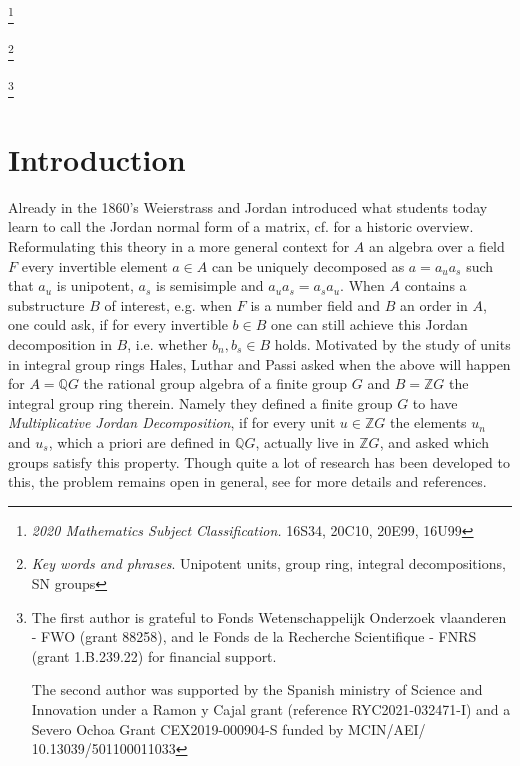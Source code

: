\documentclass[a4paper,10pt]{amsart}
\theoremstyle{definition}
\theoremstyle{remark}
\begin{document}
\maketitle

\newcommand\blfootnote[1]{%
  \begingroup
  \renewcommand\thefootnote{}\footnote{#1}%
  \addtocounter{footnote}{-1}%
  \endgroup
}

\blfootnote{\textit{2020 Mathematics Subject Classification.} 16S34, 20C10, 20E99, 16U99}
\blfootnote{\textit{Key words and phrases}. Unipotent units, group ring, integral decompositions, SN groups}
\blfootnote{The first author is grateful to Fonds Wetenschappelijk Onderzoek vlaanderen - FWO (grant 88258), and le Fonds de la Recherche Scientifique - FNRS (grant 1.B.239.22) for financial support.

The second author was supported by the Spanish ministry of Science and Innovation under a Ramon y Cajal grant (reference RYC2021-032471-I) and a Severo Ochoa Grant CEX2019-000904-S funded by MCIN/AEI/ 10.13039/501100011033}

\vspace{-0,4cm}
\tableofcontents

\section{Introduction}
Already in the 1860's Weierstrass and Jordan introduced what students today learn to call the Jordan normal form of a matrix, cf. \cite{Hawkins} for a historic overview. Reformulating this theory in a more general context for $A$ an algebra over a field $F$ every invertible element $a \in A$ can be uniquely decomposed as $a = a_u a_s$ such that $a_u$ is unipotent, $a_s$ is semisimple and $a_u a_s = a_sa_u$. When $A$ contains a substructure $B$ of interest, e.g. when $F$ is a number field and $B$ an order in $A$, one could ask, if for every invertible $b \in B$ one can still achieve this Jordan decomposition in $B$, i.e. whether $b_n,b_s \in B$ holds. Motivated by the study of units in integral group rings Hales, Luthar and Passi asked when the above will happen for $A= \mathbb{Q}G$ the rational group algebra of a finite group $G$ and $B = \mathbb{Z}G$ the integral group ring therein. Namely they defined a finite group $G$ to have \emph{Multiplicative Jordan Decomposition}, if for every unit $u \in \mathbb{Z}G$ the elements $u_n$ and $u_s$, which a priori are defined in $\mathbb{Q}G$, actually live in $\mathbb{Z}G$, and asked which groups satisfy this property. Though quite a lot of research has been developed to this, the problem remains open in general, see  for more details and references. 
\end{document}
